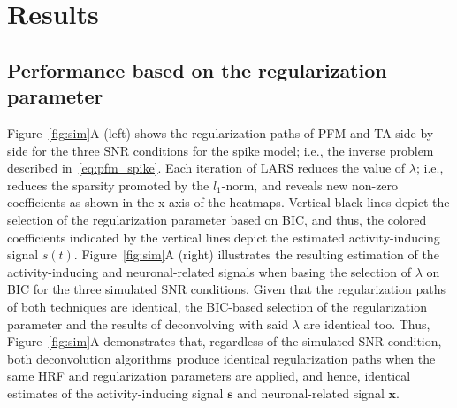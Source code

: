 
\section{Results}


\subsection{Performance based on the regularization parameter}
\label{sec:regpath}

Figure~\ref{fig:sim}A (left) shows the regularization paths of PFM and TA side by side for the three SNR conditions for the spike model; i.e., the inverse problem described in~\eqref{eq:pfm_spike}. Each iteration of LARS reduces the value of \(\lambda\); i.e., reduces the sparsity promoted by the \(l_1\)-norm, and reveals new non-zero coefficients as shown in the x-axis of the heatmaps. Vertical black lines depict the selection of the regularization parameter based on BIC, and thus, the colored coefficients indicated by the vertical lines depict the estimated activity-inducing signal \(s(t)\). Figure~\ref{fig:sim}A (right) illustrates the resulting estimation of the activity-inducing and neuronal-related signals when basing the selection of \(\lambda\) on BIC for the three simulated SNR conditions. Given that the regularization paths of both techniques are identical, the BIC-based selection of the regularization parameter and the results of deconvolving with said \(\lambda\) are identical too. Thus, Figure~\ref{fig:sim}A demonstrates that, regardless of the simulated SNR condition, both deconvolution algorithms produce identical regularization paths when the same HRF and regularization parameters are applied, and hence, identical estimates of the activity-inducing signal \(\mathbf{s}\) and neuronal-related signal \(\mathbf{x}\).

